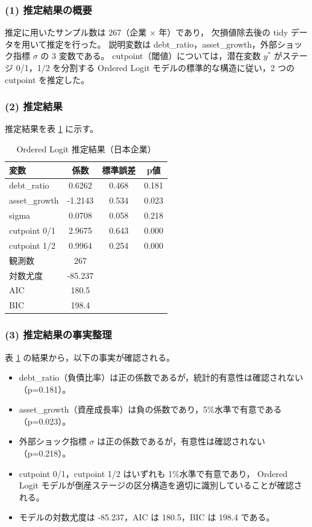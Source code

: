 \subsubsection{(1) 推定結果の概要}

推定に用いたサンプル数は 267（企業 × 年）であり，
欠損値除去後の tidy データを用いて推定を行った。
説明変数は debt\_ratio，asset\_growth，外部ショック指標 $\sigma$ の 3 変数である。
cutpoint（閾値）については，潜在変数 $y^*$ がステージ 0/1，1/2 を分割する
Ordered Logit モデルの標準的な構造に従い，2 つの cutpoint を推定した。

\subsubsection{(2) 推定結果}

推定結果を表 \ref{tab:ordered_logit_results_jp} に示す。

\begin{table}[H]
\centering
\caption{Ordered Logit 推定結果（日本企業）}
\label{tab:ordered_logit_results_jp}
\begin{tabular}{lccc}
\toprule
変数 & 係数 & 標準誤差 & p値 \\
\midrule
debt\_ratio & 0.6262 & 0.468 & 0.181 \\
asset\_growth & -1.2143 & 0.534 & 0.023 \\
sigma & 0.0708 & 0.058 & 0.218 \\
\midrule
cutpoint 0/1 & 2.9675 & 0.643 & 0.000 \\
cutpoint 1/2 & 0.9964 & 0.254 & 0.000 \\
\midrule
観測数 & 267 & & \\
対数尤度 & -85.237 & & \\
AIC & 180.5 & & \\
BIC & 198.4 & & \\
\bottomrule
\end{tabular}
\end{table}

\subsubsection{(3) 推定結果の事実整理}

表 \ref{tab:ordered_logit_results_jp} の結果から，以下の事実が確認される。

\begin{itemize}
    \item debt\_ratio（負債比率）は正の係数であるが，統計的有意性は確認されない（p=0.181）。
    \item asset\_growth（資産成長率）は負の係数であり，5\%水準で有意である（p=0.023）。
    \item 外部ショック指標 $\sigma$ は正の係数であるが，有意性は確認されない（p=0.218）。
    \item cutpoint 0/1，cutpoint 1/2 はいずれも 1\%水準で有意であり，
          Ordered Logit モデルが倒産ステージの区分構造を適切に識別していることが確認される。
    \item モデルの対数尤度は -85.237，AIC は 180.5，BIC は 198.4 である。
\end{itemize}


